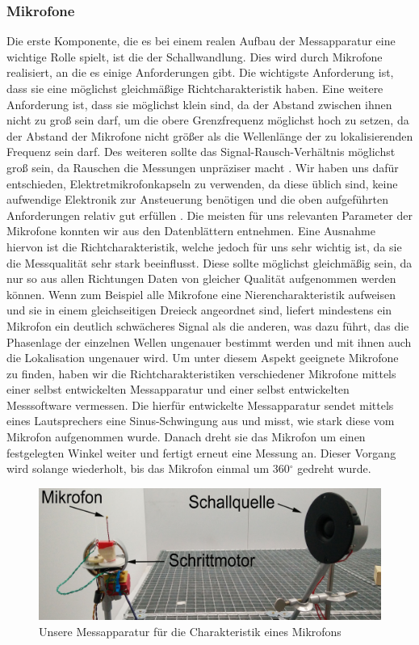 \subsubsection{Mikrofone}
Die erste Komponente, die es bei einem realen Aufbau der Messapparatur eine wichtige Rolle spielt, ist die der Schallwandlung. Dies wird durch Mikrofone realisiert, an die es einige Anforderungen gibt. Die wichtigste Anforderung ist, dass sie eine möglichst gleichmäßige Richtcharakteristik haben.
Eine weitere Anforderung ist, dass sie möglichst klein sind, da der Abstand zwischen ihnen nicht zu groß sein darf, um die obere Grenzfrequenz möglichst hoch zu setzen, da der Abstand der Mikrofone nicht größer als die Wellenlänge der zu lokalisierenden Frequenz sein darf. Des weiteren sollte das Signal-Rausch-Verhältnis möglichst groß sein, da Rauschen die Messungen unpräziser macht \cite{Rausch}.
Wir haben uns dafür entschieden, Elektretmikrofonkapseln zu verwenden, da diese üblich sind, keine aufwendige Elektronik zur Ansteuerung benötigen und die oben aufgeführten Anforderungen relativ gut erfüllen \cite{elektret}.
Die meisten für uns relevanten Parameter der Mikrofone konnten wir aus den Datenblättern entnehmen. Eine Ausnahme hiervon ist die Richtcharakteristik, welche jedoch für uns sehr wichtig ist, da sie die Messqualität sehr stark beeinflusst. Diese sollte möglichst gleichmäßig sein, da nur so aus allen Richtungen Daten von gleicher Qualität aufgenommen werden können. Wenn zum Beispiel alle Mikrofone eine Nierencharakteristik aufweisen und sie in einem gleichseitigen Dreieck angeordnet sind, liefert mindestens ein Mikrofon ein deutlich schwächeres Signal als die anderen, was dazu führt, das die Phasenlage der einzelnen Wellen ungenauer bestimmt werden und mit ihnen auch die Lokalisation ungenauer wird.
Um unter diesem Aspekt geeignete Mikrofone zu finden, haben wir die Richtcharakteristiken verschiedener Mikrofone mittels einer selbst entwickelten Messapparatur und einer selbst entwickelten Messsoftware vermessen. Die hierfür entwickelte Messapparatur sendet mittels eines Lautsprechers eine Sinus-Schwingung aus und misst, wie stark diese vom Mikrofon aufgenommen wurde. Danach dreht sie das Mikrofon um einen festgelegten Winkel weiter und fertigt erneut eine Messung an. Dieser Vorgang wird solange wiederholt, bis das Mikrofon einmal um 360$^{\circ}$ gedreht wurde.
\begin{figure}[H]
  \centering
  \includegraphics[width=0.8\linewidth]{img/chara_mess}
  \caption{Unsere Messapparatur für die Charakteristik eines Mikrofons}
\end{figure}
